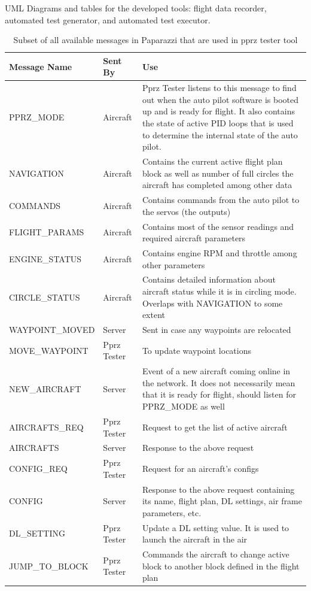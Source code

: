 UML Diagrams and tables for the developed tools: flight data recorder, automated test generator, and automated test executor.
\begin{table}[]
    \centering
\begin{longtable}{llp{}}
\toprule
\textbf{Message Name }   & \textbf{Sent By }    & \textbf{Use}                                                                     \\ \hline
\endhead
%
\hline
\endfoot
%
\endlastfoot
%
PPRZ\_MODE &
  Aircraft &
  Pprz Tester listens to this message to find out when the auto pilot software is booted up and is ready for flight. It also contains the state of active PID loops that is used to determine the internal state of the auto pilot. \\
NAVIGATION &
  Aircraft &
  Contains the current active flight plan block as well as number of full circles the aircraft has completed among other data \\
COMMANDS        & Aircraft    & Contains commands from the auto pilot to the servos (the outputs)       \\
FLIGHT\_PARAMS  & Aircraft    & Contains most of the sensor readings and required aircraft parameters   \\
ENGINE\_STATUS  & Aircraft    & Contains engine RPM and throttle among other parameters                 \\
CIRCLE\_STATUS &
  Aircraft &
  Contains detailed information about aircraft status while it is in circling mode. Overlaps with NAVIGATION to some extent \\
WAYPOINT\_MOVED & Server      & Sent in case any waypoints are relocated                                \\
MOVE\_WAYPOINT  & Pprz Tester & To update waypoint locations                                            \\
NEW\_AIRCRAFT &
  Server &
  Event of a new aircraft coming online in the network. It does not necessarily mean that it is ready for flight, should listen for PPRZ\_MODE as well \\
AIRCRAFTS\_REQ  & Pprz Tester & Request to get the list of active aircraft                              \\
AIRCRAFTS       & Server      & Response to the above request                                           \\
CONFIG\_REQ     & Pprz Tester & Request for an aircraft's configs                                       \\
CONFIG &
  Server &
  Response to the above request containing  its name, flight plan, DL settings, air frame parameters, etc. \\
DL\_SETTING     & Pprz Tester & Update a DL setting value. It is used to launch the aircraft in the air \\
JUMP\_TO\_BLOCK & Pprz Tester & Commands the aircraft to change active block to another block defined in the flight plan  \\ \bottomrule
\end{longtable}
\caption{Subset of all available messages in Paparazzi that are used in pprz tester tool}
\label{tab:pprz_messages}
\end{table}

